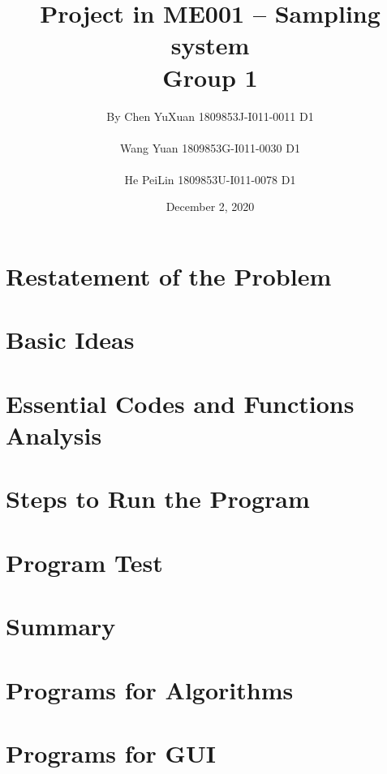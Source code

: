 \documentclass[12pt]{article}
\numberwithin{figure}{subsection}
\numberwithin{table}{subsection}
\begin{document}
\title{\textbf{Project in ME001 -- Sampling system\\Group 1}}

\author{By Chen YuXuan 1809853J-I011-0011 D1\\ \\
Wang Yuan 1809853G-I011-0030 D1\\ \\
He PeiLin 1809853U-I011-0078 D1}

\date{December 2, 2020}
\maketitle

\newpage
\tableofcontents
\newpage

\section{Restatement of the Problem}


\section{Basic Ideas}


\section{Essential Codes and Functions Analysis}


\section{Steps to Run the Program}


\section{Program Test}


\section{Summary}




\newpage
\appendix
\appendixpage
\addappheadtotoc
    \section{Programs for Algorithms}
        \lstset{title=\lstname}
        
    \section{Programs for GUI}
        \lstset{title=\lstname}
        
\end{document}
